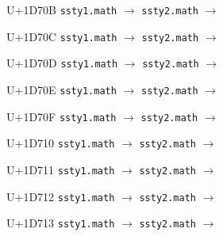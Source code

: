 \documentclass{article}
\begin{document}
\begin{substitutions}
\goodbreak

U+1D70B  \linebreak
    \texttt{ssty1.math} $\to$  \linebreak
    \texttt{ssty2.math} $\to$  

\goodbreak

U+1D70C  \linebreak
    \texttt{ssty1.math} $\to$  \linebreak
    \texttt{ssty2.math} $\to$  

\goodbreak

U+1D70D  \linebreak
    \texttt{ssty1.math} $\to$  \linebreak
    \texttt{ssty2.math} $\to$  

\goodbreak

U+1D70E  \linebreak
    \texttt{ssty1.math} $\to$  \linebreak
    \texttt{ssty2.math} $\to$  

\goodbreak

U+1D70F  \linebreak
    \texttt{ssty1.math} $\to$  \linebreak
    \texttt{ssty2.math} $\to$  

\goodbreak

U+1D710  \linebreak
    \texttt{ssty1.math} $\to$  \linebreak
    \texttt{ssty2.math} $\to$  

\goodbreak

U+1D711  \linebreak
    \texttt{ssty1.math} $\to$  \linebreak
    \texttt{ssty2.math} $\to$  

\goodbreak

U+1D712  \linebreak
    \texttt{ssty1.math} $\to$  \linebreak
    \texttt{ssty2.math} $\to$  

\goodbreak

U+1D713  \linebreak
    \texttt{ssty1.math} $\to$  \linebreak
    \texttt{ssty2.math} $\to$  


\end{substitutions}
\end{document}
